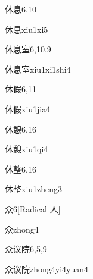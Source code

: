 \begin{entry}{休息}{6,10}
  \begin{phonetics}{休息}{xiu1xi5}
  \end{phonetics}
\end{entry}

\begin{entry}{休息室}{6,10,9}
  \begin{phonetics}{休息室}{xiu1xi1shi4}
  \end{phonetics}
\end{entry}

\begin{entry}{休假}{6,11}
  \begin{phonetics}{休假}{xiu1jia4}
  \end{phonetics}
\end{entry}

\begin{entry}{休憩}{6,16}
  \begin{phonetics}{休憩}{xiu1qi4}
  \end{phonetics}
\end{entry}

\begin{entry}{休整}{6,16}
  \begin{phonetics}{休整}{xiu1zheng3}
  \end{phonetics}
\end{entry}

\begin{entry}{众}{6}[Radical 人]
  \begin{phonetics}{众}{zhong4}
  \end{phonetics}
\end{entry}

\begin{entry}{众议院}{6,5,9}
  \begin{phonetics}{众议院}{zhong4yi4yuan4}
  \end{phonetics}
\end{entry}

